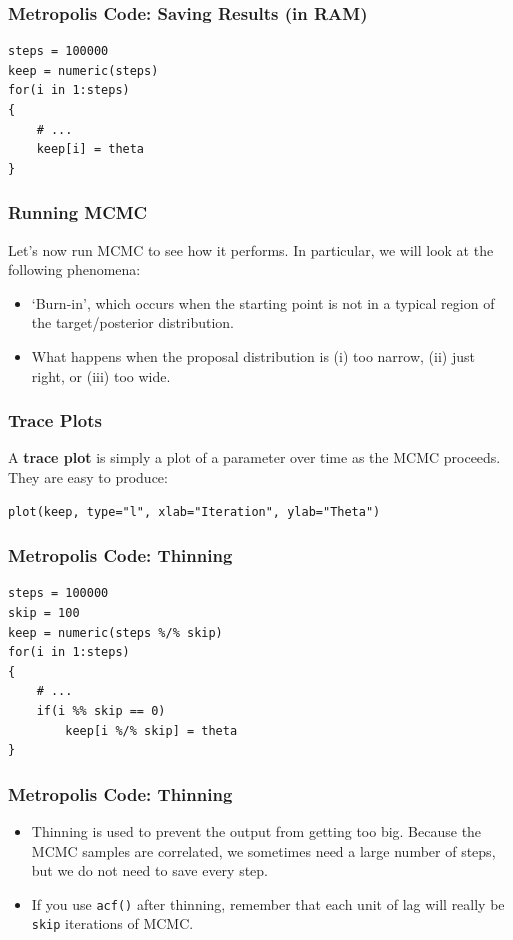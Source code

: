 \documentclass{beamer}
\begin{document}
\begin{frame}[fragile]
\frametitle{Metropolis Code: Saving Results (in RAM)}
\begin{verbatim}
steps = 100000
keep = numeric(steps)
for(i in 1:steps)
{
    # ...
    keep[i] = theta
}
\end{verbatim}
\end{frame}


\begin{frame}
\frametitle{Running MCMC}
Let's now run MCMC to see how it performs. In particular, we will look at
the following phenomena:
\begin{itemize}
\item `Burn-in', which occurs when the starting point is not in a typical region
of the target/posterior distribution.\pause
\item What happens when the proposal distribution is (i) too narrow,
(ii) just right, or (iii) too wide.
\end{itemize}

\end{frame}



\begin{frame}[fragile]
\frametitle{Trace Plots}
A {\bf trace plot} is simply a plot of a parameter over time as the MCMC
proceeds. They are easy to produce:
\begin{verbatim}
plot(keep, type="l", xlab="Iteration", ylab="Theta")
\end{verbatim}

\end{frame}



\begin{frame}[fragile]
\frametitle{Metropolis Code: Thinning}
\begin{verbatim}
steps = 100000
skip = 100
keep = numeric(steps %/% skip)
for(i in 1:steps)
{
    # ...
    if(i %% skip == 0)
        keep[i %/% skip] = theta
}
\end{verbatim}
\end{frame}


\begin{frame}[fragile]
\frametitle{Metropolis Code: Thinning}
\begin{itemize}
\item Thinning is used to prevent the output from getting too big.
Because the MCMC samples are correlated, we sometimes need a large number
of steps, but we do not need to save every step. \pause
\item If you use \texttt{acf()} after thinning, remember that each unit
of lag will really be \texttt{skip} iterations of MCMC.
\end{itemize}
\end{frame}
\end{document}
